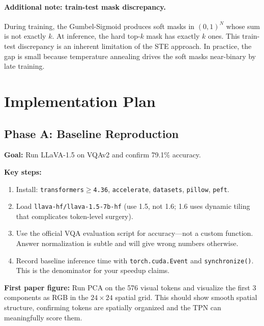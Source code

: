 \documentclass[12pt,a4paper]{article}
\begin{document}
\paragraph{Additional note: train-test mask discrepancy.}
During training, the Gumbel-Sigmoid produces soft masks in $(0,1)^N$ whose sum
is not exactly $k$. At inference, the hard top-$k$ mask has exactly $k$ ones.
This train-test discrepancy is an inherent limitation of the STE approach.
In practice, the gap is small because temperature annealing drives the soft masks
near-binary by late training.

\section{Implementation Plan}
\label{sec:implementation}

\subsection{Phase A: Baseline Reproduction}

\textbf{Goal:} Run LLaVA-1.5 on VQAv2 and confirm 79.1\% accuracy.

\textbf{Key steps:}
\begin{enumerate}[leftmargin=2em]
  \item Install: \texttt{transformers$\geq$4.36}, \texttt{accelerate},
    \texttt{datasets}, \texttt{pillow}, \texttt{peft}.
  \item Load \texttt{llava-hf/llava-1.5-7b-hf} (use 1.5, not 1.6; 1.6 uses
    dynamic tiling that complicates token-level surgery).
  \item Use the official VQA evaluation script for accuracy---not a custom
    function. Answer normalization is subtle and will give wrong numbers otherwise.
  \item Record baseline inference time with \texttt{torch.cuda.Event} and
    \texttt{synchronize()}. This is the denominator for your speedup claims.
\end{enumerate}

\textbf{First paper figure:} Run PCA on the 576 visual tokens and visualize the
first 3 components as RGB in the $24 \times 24$ spatial grid. This should show
smooth spatial structure, confirming tokens are spatially organized and the TPN
can meaningfully score them.
\end{document}
